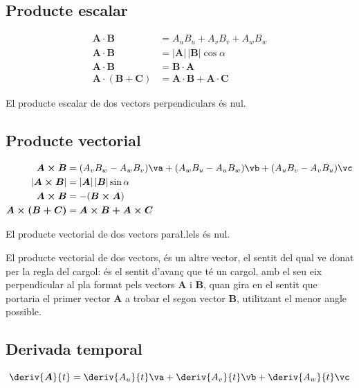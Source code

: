 \documentclass[catalan,a4paper,twoside,11pt]{article}
\begin{document}
\subsection{Producte escalar}
\vspace{-5mm}
\begin{align}
    \boldsymbol{A\cdot B} &= A_u B_u + A_v B_v + A_w B_w\\
    \boldsymbol{A\cdot B} &=|\boldsymbol{A}| \, |\boldsymbol{B}| \cos\alpha\\
    \boldsymbol{A\cdot B} &=\boldsymbol{B\cdot A}\\
    \boldsymbol{A\cdot(B+C)} &= \boldsymbol{A\cdot B+ A\cdot C}
\end{align}

El producte escalar de dos vectors perpendiculars  \'{e}s nul.

\subsection{Producte vectorial}
\vspace{-5mm}
\begin{align}
    \boldsymbol{A\times B} &= (A_v B_w - A_w B_v)\va + (A_w B_u - A_u B_w)\vb +
    (A_u B_v - A_v B_u)\vc \\
    |\boldsymbol{A\times B}| &=|\boldsymbol{A}| \, |\boldsymbol{B}| \sin\alpha\\
    \boldsymbol{A\times B} &=-(\boldsymbol{B\times A})\\
    \boldsymbol{A\times(B+C)} &= \boldsymbol{A\times B+ A\times C}
\end{align}

El producte vectorial de dos vectors para{\l.l}els  \'{e}s nul.

El producte vectorial de dos vectors, \'{e}s un altre vector, el
sentit del qual ve donat per la regla del cargol: \'{e}s el sentit
d'avan\c{c} que t\'{e} un cargol, amb el seu eix perpendicular al
pla format pels vectors  $\boldsymbol{A}$ i $\boldsymbol{B}$, quan
gira en el sentit que portaria el primer vector  $\boldsymbol{A}$ a
trobar el segon vector $\boldsymbol{B}$, utilitzant el menor angle
possible.

\subsection{Derivada temporal}
\begin{equation}
    \deriv{\boldsymbol{A}}{t} = \deriv{A_u}{t}\va +
    \deriv{A_v}{t}\vb + \deriv{A_w}{t}\vc
\end{equation}
\end{document}
